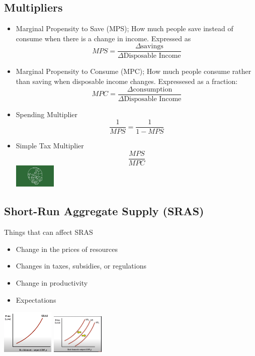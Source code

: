 \documentclass[8pt]{beamer}
\begin{document}
  \begin{frame}
	\section{Multipliers}
	\begin{itemize}
		\item Marginal Propensity to Save (MPS); How much people save instead of
		consume when there is a change in income. Expressed as $$MPS=\frac{\Delta \text{savings}}{\Delta \text {Disposable Income}}$$
		\item Marginal Propensity to Consume (MPC); How much people consume
		rather than saving when disposable income changes. Expressesed as a fraction:
		$$MPC = \frac{\Delta \text{consumption}}{\Delta \text{Disposable Income}}$$
		\item Spending Multiplier
		$$\frac{1}{MPS} = \frac{1}{1 - MPS}$$
		\item Simple Tax Multiplier
		$$\frac{MPS}{MPC}$$
		\center \includegraphics[width=2cm]{2021-10-12-12-10-06.png}
	\end{itemize}
  \end{frame}
  \begin{frame}
	\section{Short-Run Aggregate Supply (SRAS)}
	Things that can affect SRAS
	\begin{itemize}
		\item Change in the prices of resources
		\item Changes in taxes, subsidies, or regulations
		\item Change in productivity
		\item Expectations
	\end{itemize}
	\includegraphics[width=2.5cm]{2021-10-12-12-11-36.png} \includegraphics[width=2.5cm]{2021-10-12-12-12-26.png}
  \end{frame}
\end{document}
